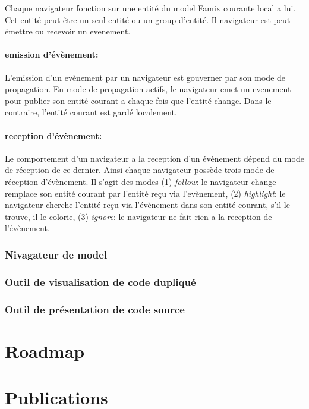 \documentclass[a4paper]{article}
\begin{document}
Chaque navigateur fonction sur une entité du model Famix courante local a lui.
Cet entité peut être un seul entité ou un group d'entité.
Il navigateur est peut émettre ou recevoir un evenement. 
\paragraph{emission d'évènement: }L'emission d'un evènement par un navigateur est gouverner par son mode de propagation.
En mode de propagation actifs, le navigateur emet un evenement pour publier  son entité courant a chaque fois que l'entité change.
Dans le contraire, l'entité courant est gardé localement.

\paragraph{reception d'évènement: } Le comportement d'un navigateur a la reception d'un évènement dépend du mode de réception de ce dernier.
Ainsi chaque navigateur possède trois mode de réception d'évènement. 
Il s'agit des modes (1) \textit{follow}: le navigateur change remplace son entité courant par l'entité reçu via l'evènement,
(2) \textit{highlight}: le navigateur cherche l'entité reçu via l'évènement dans son entité courant, s'il le trouve, il le colorie,
(3) \textit{ignore}: le navigateur ne fait rien a la reception de l'évènement.


\subsubsection{Nivagateur de model}


\subsubsection{Outil de visualisation de code dupliqué}

\subsubsection{Outil de présentation de code source}

\section{Roadmap}
\label{sec:roadmap}

\section{Publications}
\end{document}
